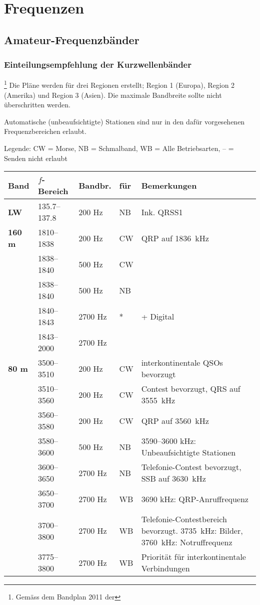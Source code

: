 
\chapter{Frequenzen}
\section{Amateur-Frequenzbänder}
\subsection{Einteilungsempfehlung der Kurzwellenbänder}\footnote{Gemäss dem Bandplan 2011 der }
Die Pläne werden für drei Regionen erstellt; Region 1 (Europa), Region 2 (Amerika) und Region 3 (Asien). Die maximale Bandbreite sollte nicht überschritten werden.

Automatische (unbeaufsichtigte) Stationen sind nur in den dafür vorgesehenen Frequenzbereichen erlaubt.

Legende: CW = Morse, NB = Schmalband, WB = Alle Betriebsarten, -- =  Senden nicht erlaubt

{
\setlength{\belowrulesep}{1pt}
\setlength{\aboverulesep}{1pt}
\newcommand{\wrap}[1]{\begin{minipage}[t]{5.5cm}#1\end{minipage}}
\begin{longtabu} to 
\rowfont \bfseries Band & $f$-Bereich & Bandbr. & für & Bemerkungen \\
\toprule
\endhead
{}
\bfseries LW & 135.7–137.8 & 200 Hz & NB & Ink. QRSS1 \\
\midrule
\bfseries 160 m & 1810–1838 & 200 Hz & CW & QRP auf 1836 kHz \\
 & 1838–1840 & 500 Hz & CW \\
 & 1838–1840 & 500 Hz & NB \\
 & 1840–1843 & 2700 Hz & * & + Digital \\
 & 1843–2000 & 2700 Hz \\
\midrule
\bfseries 80 m & 3500–3510 & 200 Hz & CW & interkontinentale QSOs bevorzugt \\
 & 3510–3560 & 200 Hz & CW & Contest bevorzugt, QRS auf 3555 kHz \\
 & 3560–3580 & 200 Hz & CW & QRP auf 3560 kHz \\
 & 3580–3600 & 500 Hz & NB & 3590–3600 kHz: Unbeaufsichtigte Stationen\\
 & 3600–3650 & 2700 Hz & NB & Telefonie-Contest bevorzugt, SSB auf 3630 kHz\\
 & 3650–3700 & 2700 Hz & WB & 3690 kHz: QRP-Anruffrequenz\\
 & 3700–3800 & 2700 Hz & WB & Telefonie-Contest­bereich bevorzugt. 3735 kHz: Bilder, 3760 kHz: Notruffrequenz\\
 & 3775–3800 & 2700 Hz & WB & Priorität für interkontinentale Verbindungen
\end{longtabu}
}